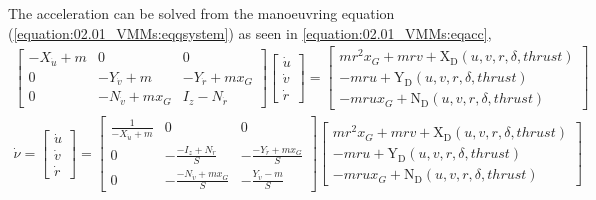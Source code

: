 \noindent The acceleration can be solved from the manoeuvring equation (\autoref{equation:02.01_VMMs:eqqsystem}) \cite{fossen_handbook_2021} as seen in \autoref{equation:02.01_VMMs:eqacc},
\begin{equation}\label{equation:02.01_VMMs:eqqsystem}
\begin{split}\displaystyle \left[\begin{matrix}- X_{\dot{u}} + m & 0 & 0\\0 & - Y_{\dot{v}} + m & - Y_{\dot{r}} + m x_{G}\\0 & - N_{\dot{v}} + m x_{G} & I_{z} - N_{\dot{r}}\end{matrix}\right] \left[\begin{matrix}\dot{u}\\\dot{v}\\\dot{r}\end{matrix}\right] = \left[\begin{matrix}m r^{2} x_{G} + m r v + \operatorname{X_{D}}{\left(u,v,r,\delta,thrust \right)}\\- m r u + \operatorname{Y_{D}}{\left(u,v,r,\delta,thrust \right)}\\- m r u x_{G} + \operatorname{N_{D}}{\left(u,v,r,\delta,thrust \right)}\end{matrix}\right]\end{split}
\end{equation}\begin{equation}\label{equation:02.01_VMMs:eqacc}
\begin{split}\displaystyle \dot{\nu} = \left[\begin{matrix}\dot{u}\\\dot{v}\\\dot{r}\end{matrix}\right] = \left[\begin{matrix}\frac{1}{- X_{\dot{u}} + m} & 0 & 0\\0 & - \frac{- I_{z} + N_{\dot{r}}}{S} & - \frac{- Y_{\dot{r}} + m x_{G}}{S}\\0 & - \frac{- N_{\dot{v}} + m x_{G}}{S} & - \frac{Y_{\dot{v}} - m}{S}\end{matrix}\right] \left[\begin{matrix}m r^{2} x_{G} + m r v + \operatorname{X_{D}}{\left(u,v,r,\delta,thrust \right)}\\- m r u + \operatorname{Y_{D}}{\left(u,v,r,\delta,thrust \right)}\\- m r u x_{G} + \operatorname{N_{D}}{\left(u,v,r,\delta,thrust \right)}\end{matrix}\right]\end{split}
\end{equation}

